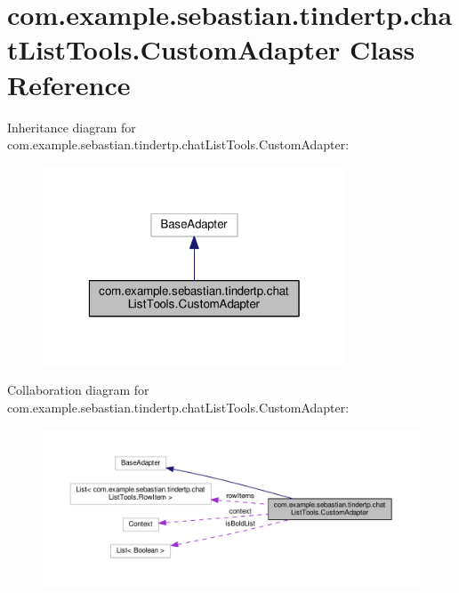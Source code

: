 \hypertarget{classcom_1_1example_1_1sebastian_1_1tindertp_1_1chatListTools_1_1CustomAdapter}{}\section{com.\+example.\+sebastian.\+tindertp.\+chat\+List\+Tools.\+Custom\+Adapter Class Reference}
\label{classcom_1_1example_1_1sebastian_1_1tindertp_1_1chatListTools_1_1CustomAdapter}


Inheritance diagram for com.\+example.\+sebastian.\+tindertp.\+chat\+List\+Tools.\+Custom\+Adapter\+:\nopagebreak
\begin{figure}[H]
\begin{center}
\leavevmode
\includegraphics[width=256pt]{classcom_1_1example_1_1sebastian_1_1tindertp_1_1chatListTools_1_1CustomAdapter__inherit__graph}
\end{center}
\end{figure}


Collaboration diagram for com.\+example.\+sebastian.\+tindertp.\+chat\+List\+Tools.\+Custom\+Adapter\+:\nopagebreak
\begin{figure}[H]
\begin{center}
\leavevmode
\includegraphics[width=350pt]{classcom_1_1example_1_1sebastian_1_1tindertp_1_1chatListTools_1_1CustomAdapter__coll__graph}
\end{center}
\end{figure}
